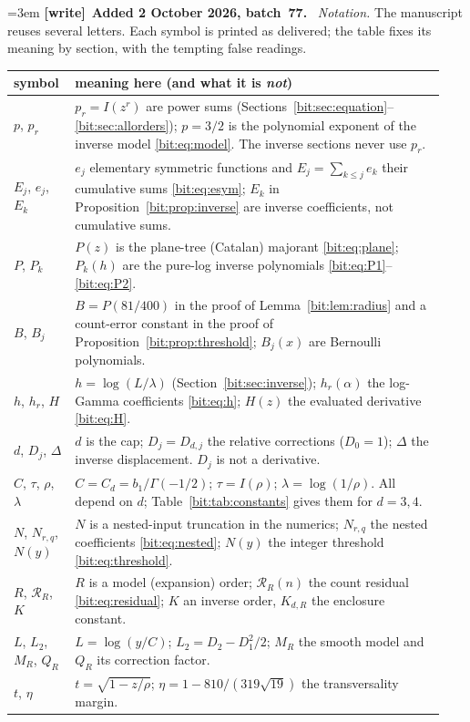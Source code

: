 \documentclass[11pt]{article}
\theoremstyle{definition}\newtheorem{definition}[theorem]{Definition}
\theoremstyle{remark}\newtheorem{remark}[theorem]{Remark}
\newenvironment{writenote}[1][]{\par\smallskip\begingroup\small\emergencystretch=3em
 \noindent\textbf{[write]}\if\relax\detokenize{#1}\relax\else~\textbf{#1.}\fi\ }%
 {\par\endgroup\smallskip}
\begin{document}
\begin{writenote}[Added 2 October 2026, batch~77]
\emph{Notation.} The manuscript reuses several letters. Each symbol is printed
as delivered; the table fixes its meaning by section, with the tempting false
readings.
\begin{center}\footnotesize
\begin{tabular}{@{}>{\raggedright\arraybackslash}p{0.13\linewidth}>{\raggedright\arraybackslash}p{0.81\linewidth}@{}}
\toprule
symbol & meaning here (and what it is \emph{not})\\
\midrule
$p$, $p_r$ & $p_r=I(z^r)$ are power sums (Sections~\ref{bit:sec:equation}--\ref{bit:sec:allorders}); $p=3/2$ is the polynomial exponent of the inverse model \eqref{bit:eq:model}. The inverse sections never use $p_r$.\\
$E_j$, $e_j$, $E_k$ & $e_j$ elementary symmetric functions and $E_j=\sum_{k\le j}e_k$ their cumulative sums \eqref{bit:eq:esym}; $E_k$ in Proposition~\ref{bit:prop:inverse} are inverse coefficients, not cumulative sums.\\
$P$, $P_k$ & $P(z)$ is the plane-tree (Catalan) majorant \eqref{bit:eq:plane}; $P_k(h)$ are the pure-log inverse polynomials \eqref{bit:eq:P1}--\eqref{bit:eq:P2}.\\
$B$, $B_j$ & $B=P(81/400)$ in the proof of Lemma~\ref{bit:lem:radius} and a count-error constant in the proof of Proposition~\ref{bit:prop:threshold}; $B_j(x)$ are Bernoulli polynomials.\\
$h$, $h_r$, $H$ & $h=\log(L/\lambda)$ (Section~\ref{bit:sec:inverse}); $h_r(\alpha)$ the log-Gamma coefficients \eqref{bit:eq:h}; $H(z)$ the evaluated derivative \eqref{bit:eq:H}.\\
$d$, $D_j$, $\Delta$ & $d$ is the cap; $D_j=D_{d,j}$ the relative corrections ($D_0=1$); $\Delta$ the inverse displacement. $D_j$ is not a derivative.\\
$C$, $\tau$, $\rho$, $\lambda$ & $C=C_d=b_1/\Gamma(-1/2)$; $\tau=I(\rho)$; $\lambda=\log(1/\rho)$. All depend on $d$; Table~\ref{bit:tab:constants} gives them for $d=3,4$.\\
$N$, $N_{r,q}$, $N(y)$ & $N$ is a nested-input truncation in the numerics; $N_{r,q}$ the nested coefficients \eqref{bit:eq:nested}; $N(y)$ the integer threshold \eqref{bit:eq:threshold}.\\
$R$, $\mathcal R_R$, $K$ & $R$ is a model (expansion) order; $\mathcal R_R(n)$ the count residual \eqref{bit:eq:residual}; $K$ an inverse order, $K_{d,R}$ the enclosure constant.\\
$L$, $L_2$, $M_R$, $Q_R$ & $L=\log(y/C)$; $L_2=D_2-D_1^2/2$; $M_R$ the smooth model and $Q_R$ its correction factor.\\
$t$, $\eta$ & $t=\sqrt{1-z/\rho}$; $\eta=1-810/(319\sqrt{19})$ the transversality margin.\\
\bottomrule
\end{tabular}
\end{center}
\end{writenote}
\end{document}
